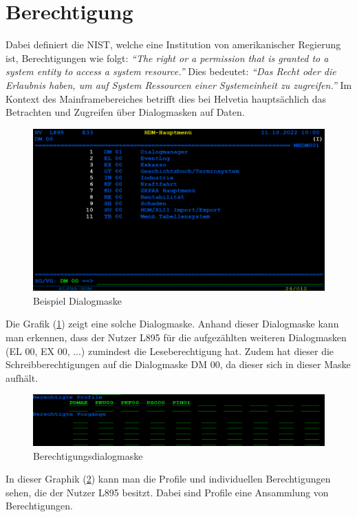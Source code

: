 \section{Berechtigung}
\label{sec:Berechtigung}
Dabei definiert die \ac{NIST}, welche eine Institution von amerikanischer Regierung ist, Berechtigungen wie folgt:
\newline
\newline
\textit{"`The right or a permission that is granted to a system entity to access a system resource."'} \cite{Auth}
\newline
\newline
Dies bedeutet:
\newline
\newline
\textit{"`Das Recht oder die Erlaubnis haben, um auf System Ressourcen einer Systemeinheit zu zugreifen."'} \cite{Mainframe}
\newline
\newline
Im Kontext des Mainframebereiches betrifft dies bei Helvetia hauptsächlich das Betrachten und Zugreifen über Dialogmasken auf Daten.
\begin{figure}[h!]
 \centering
 \includegraphics[width=1\textwidth]{gfx/Picture/Dialog.PNG}
 \caption{Beispiel Dialogmaske}
 \label{fig:Dial}
\end{figure}
Die Grafik (\ref{fig:Dial}) zeigt eine solche Dialogmaske.
Anhand dieser Dialogmaske kann man erkennen, dass der Nutzer L895 für die aufgezählten weiteren Dialogmasken (EL 00, EX 00, ...) zumindest die Leseberechtigung hat.
Zudem hat dieser die Schreibberechtigungen auf die Dialogmaske DM 00, da dieser sich in dieser Maske aufhält. 
\newline
\newline
\begin{figure}[h!]
 \centering
 \includegraphics[width=1\textwidth]{gfx/Picture/Berechtigung.PNG}
 \caption{Berechtigungsdialogmaske}
 \label{fig:Berch}
\end{figure}
In dieser Graphik (\ref{fig:Berch}) kann man die Profile und individuellen Berechtigungen sehen, die der Nutzer L895 besitzt.
Dabei sind Profile eine Ansammlung von Berechtigungen.


